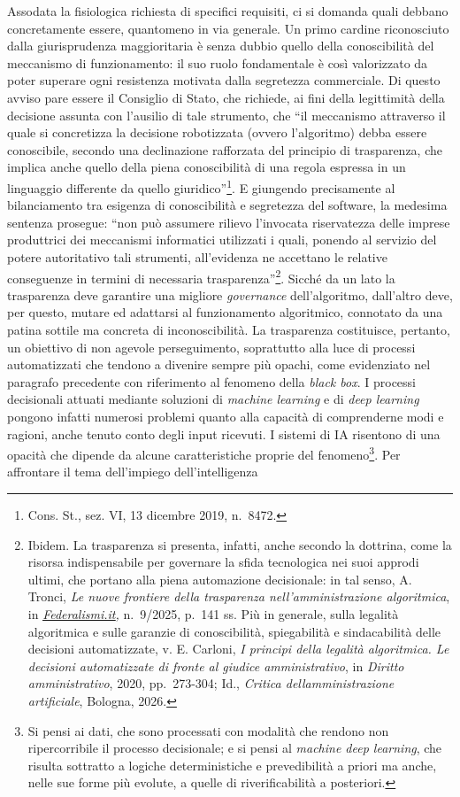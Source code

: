 \documentclass[american,a4paper,]{article}
\begin{document}
Assodata la fisiologica richiesta di specifici requisiti, ci si domanda quali debbano concretamente essere, quantomeno in via generale. Un primo cardine riconosciuto dalla giurisprudenza maggioritaria è senza dubbio quello della conoscibilità del meccanismo di funzionamento: il suo ruolo fondamentale è così valorizzato da poter superare ogni resistenza motivata dalla segretezza commerciale. Di questo avviso pare essere il Consiglio di Stato, che richiede, ai fini della legittimità della decisione assunta con l'ausilio di tale strumento, che ``il meccanismo attraverso il quale si concretizza la decisione robotizzata (ovvero l'algoritmo) debba essere conoscibile, secondo una declinazione rafforzata del principio di trasparenza, che implica anche quello della piena conoscibilità di una regola espressa in un linguaggio differente da quello giuridico''\footnote{Cons. St., sez. VI, 13 dicembre 2019, n.~8472.}. E giungendo precisamente al bilanciamento tra esigenza di conoscibilità e segretezza del software, la medesima sentenza prosegue: ``non può assumere rilievo l'invocata riservatezza delle imprese produttrici dei meccanismi informatici utilizzati i quali, ponendo al servizio del potere autoritativo tali strumenti, all'evidenza ne accettano le relative conseguenze in termini di necessaria trasparenza''\footnote{Ibidem. La trasparenza si presenta, infatti, anche secondo la dottrina, come la risorsa indispensabile per governare la sfida tecnologica nei suoi approdi ultimi, che portano alla piena automazione decisionale: in tal senso, A. Tronci, \emph{Le nuove frontiere della trasparenza nell'amministrazione algoritmica}, in \emph{\href{http://federalismi.it}{\ul{Federalismi.it}},} n.~9/2025, p.~141 ss. Più in generale, sulla legalità algoritmica e sulle garanzie di conoscibilità, spiegabilità e sindacabilità delle decisioni automatizzate, v. E. Carloni, \emph{I principi della legalità algoritmica. Le decisioni automatizzate di fronte al giudice amministrativo}, in \emph{Diritto amministrativo}, 2020, pp.~273-304; Id., \emph{Critica dell\textquotesingle amministrazione artificiale}, Bologna, 2026.}. Sicché da un lato la trasparenza deve garantire una migliore \emph{governance} dell'algoritmo, dall'altro deve, per questo, mutare ed adattarsi al funzionamento algoritmico, connotato da una patina sottile ma concreta di inconoscibilità. La trasparenza costituisce, pertanto, un obiettivo di non agevole perseguimento, soprattutto alla luce di processi automatizzati che tendono a divenire sempre più opachi, come evidenziato nel paragrafo precedente con riferimento al fenomeno della \emph{black box}. I processi decisionali attuati mediante soluzioni di \emph{machine learning} e di \emph{deep learning} pongono infatti numerosi problemi quanto alla capacità di comprenderne modi e ragioni, anche tenuto conto degli input ricevuti. I sistemi di IA risentono di una opacità che dipende da alcune caratteristiche proprie del fenomeno\footnote{Si pensi ai dati, che sono processati con modalità che rendono non ripercorribile il processo decisionale; e si pensi al \emph{machine deep learning}, che risulta sottratto a logiche deterministiche e prevedibilità a priori ma anche, nelle sue forme più evolute, a quelle di riverificabilità a posteriori.}. Per affrontare il tema dell'impiego dell'intelligenza 
\end{document}
